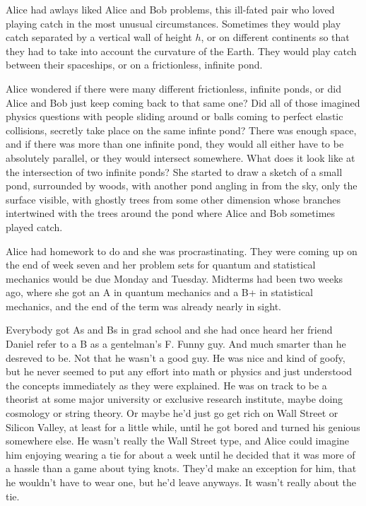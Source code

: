 \mypause

Alice had awlays liked Alice and Bob problems, this ill-fated pair who loved playing catch in the most unusual circumstances. Sometimes they would play catch separated by a vertical wall of height $h$, or on different continents so that they had to take into account the curvature of the Earth. They would play catch between their spaceships, or on a frictionless, infinite pond.

Alice wondered if there were many different frictionless, infinite ponds, or did Alice and Bob just keep coming back to that same one? Did all of those imagined physics questions with people sliding around or balls coming to perfect elastic collisions, secretly take place on the same infinte pond? There was enough space, and if there was more than one infinite pond, they would all either have to be absolutely parallel, or they would intersect somewhere. What does it look like at the intersection of two infinite ponds? She started to draw a sketch of a small pond, surrounded by woods, with another pond angling in from the sky, only the surface visible, with ghostly trees from some other dimension whose branches intertwined with the trees around the pond where Alice and Bob sometimes played catch. 

\mypause

Alice had homework to do and she was procrastinating. They were coming up on the end of week seven and her problem sets for quantum and statistical mechanics would be due Monday and Tuesday. Midterms had been two weeks ago, where she got an A in quantum mechanics and a B+ in statistical mechanics, and the end of the term was already nearly in sight. 

Everybody got As and Bs in grad school and she had once heard her friend Daniel refer to a B as a gentelman's F. Funny guy. And much smarter than he desreved to be. Not that he wasn't a good guy. He was nice and kind of goofy, but he never seemed to put any effort into math or physics and just understood the concepts immediately as they were explained. He was on track to be a theorist at some major university or exclusive research institute, maybe doing cosmology or string theory. Or maybe he'd just go get rich on Wall Street or Silicon Valley, at least for a little while, until he got bored and turned his genious somewhere else. He wasn't really the Wall Street type, and Alice could imagine him enjoying wearing a tie for about a week until he decided that it was more of a hassle than a game about tying knots. They'd make an exception for him, that he wouldn't have to wear one, but he'd leave anyways. It wasn't really about the tie.

